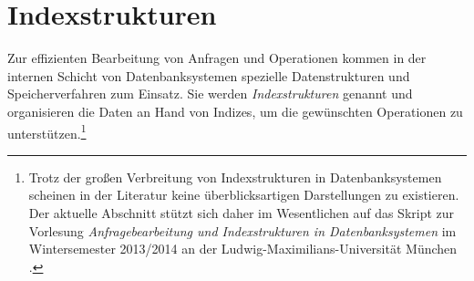 \section{Indexstrukturen}\label{sec:indexstrukturen}
Zur effizienten Bearbeitung von Anfragen und Operationen kommen in der internen Schicht von Datenbanksystemen spezielle Datenstrukturen und Speicherverfahren zum Einsatz. Sie werden \textit{Indexstrukturen} genannt und organisieren die Daten an Hand von Indizes, um die gewünschten Operationen zu unterstützen.\footnote{Trotz der großen Verbreitung von Indexstrukturen in Datenbanksystemen scheinen in der Literatur keine überblicksartigen Darstellungen zu existieren. Der aktuelle Abschnitt stützt sich daher im Wesentlichen auf das Skript zur Vorlesung \textit{Anfragebearbeitung und Indexstrukturen in Datenbanksystemen} im Wintersemester 2013/2014 an der Ludwig-Maximilians-Universität München \cite{Kriegel1994--2013}.}

